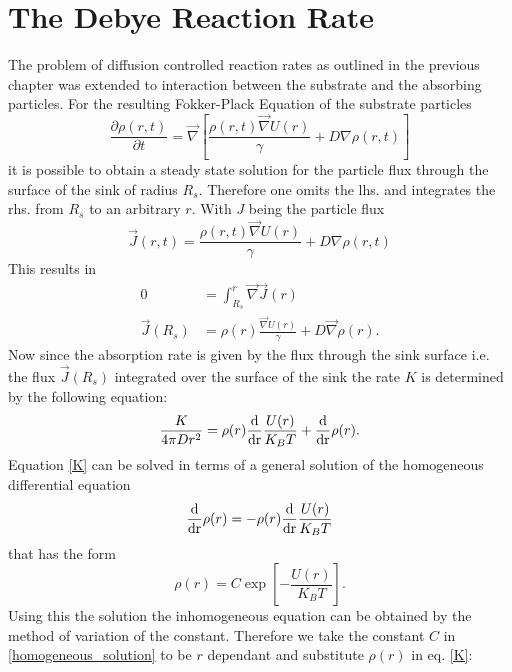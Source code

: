 \section{The Debye Reaction Rate}
\label{The_Debye_Reaction_Rate}
The problem of diffusion controlled reaction rates as outlined in the previous chapter was extended to interaction between the substrate and the absorbing particles. For the resulting Fokker-Plack Equation of the substrate particles
\begin{equation}
    \frac{\partial \rho(r,t)}{\partial t} = \vec \nabla \left[ \frac{\rho(r,t)\vec \nabla U(r)}{\gamma} + D \nabla \rho(r,t) \right]
    \label{fpe_debye}
\end{equation}
it is possible to obtain a steady state solution for the particle flux through the surface of the sink of radius $R_s$. Therefore one omits the lhs. and integrates the rhs. from $R_s$ to an arbitrary $r$. With $J$ being the particle flux
\begin{equation}
    \vec J(r,t) =  \frac{\rho(r,t)\vec \nabla U(r)}{\gamma} + D \nabla \rho(r,t)
    \label{flux}
\end{equation}
This results in
\begin{align}
    0 &= \int_{R_s}^{r} \vec \nabla \vec J(r) \nonumber \\
    \vec J(R_s) &=  \rho(r)\frac{\vec \nabla U(r)}{\gamma} + D \vec \nabla \rho(r).
\end{align}
Now since the absorption rate is given by the flux through the sink surface i.e. the flux $\vec J (R_s)$ integrated over the surface of the sink the rate $K$ is determined by the following equation:
\begin{equation}
    \frac{K}{4\pi D r^{2}} = \rho(r)\frac{\rm d}{\rm d r} \frac{U(r)}{K_B T} + \frac{\rm d}{\rm d r} \rho(r).
    \label{K}
\end{equation}
Equation \eqref{K} can be solved in terms of a general solution of the homogeneous differential equation
\begin{equation}
    \frac{\rm d}{\rm d r} \rho(r) = -\rho(r) \frac{\rm d}{\rm d r} \frac{U(r)}{K_B T}
    \label{homogeneous_equation}
\end{equation}
that has the form
\begin{equation}
    \rho(r) = C \exp \left[ - \frac{U(r)}{K_B T} \right].
    \label{homogeneous_solution}
\end{equation}
Using this the solution the inhomogeneous equation can be obtained by the method of variation of the constant. Therefore we take the constant $C$ in \eqref{homogeneous_solution} to be $r$ dependant and substitute $\rho(r)$ in eq. \eqref{K}:
